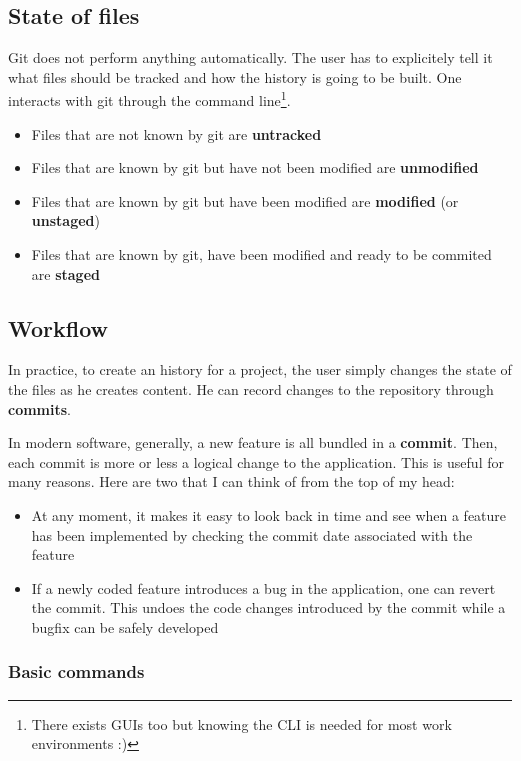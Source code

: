 \documentclass[12pt]{article}
\begin{document}
\subsection{State of files}

Git does not perform anything automatically. The user has to explicitely tell it what files should be tracked and how the history is going to be built. One interacts with git through the command line\footnote{There exists GUIs too but knowing the CLI is needed for most work environments :)}.

\begin{itemize}
\item Files that are not known by git are \textbf{untracked}
\item Files that are known by git but have not been modified are \textbf{unmodified}
\item Files that are known by git but have been modified are \textbf{modified} (or \textbf{unstaged})
\item Files that are known by git, have been modified and ready to be commited are \textbf{staged}
\end{itemize}

\subsection{Workflow}

In practice, to create an history for a project, the user simply changes the state of the files as he creates content. He can record changes to the repository through \textbf{commits}.

In modern software, generally, a new feature is all bundled in a \textbf{commit}. Then, each commit is more or less a logical change to the application. This is useful for many reasons. Here are two that I can think of from the top of my head:
\begin{itemize}
	\item At any moment, it makes it easy to look back in time and see when a feature has been implemented by checking the commit date associated with the feature
	\item If a newly coded feature introduces a bug in the application, one can revert the commit. This undoes the code changes introduced by the commit while a bugfix can be safely developed
\end{itemize}

\subsubsection{Basic commands}
\end{document}

